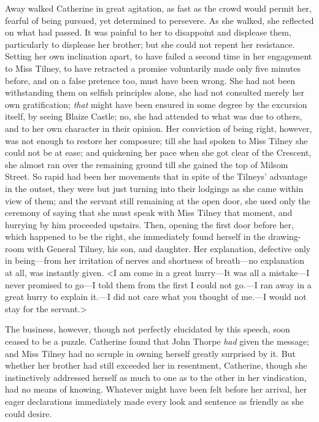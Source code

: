  Away walked Catherine in great agitation, as fast as the crowd would permit her, fearful of being pursued, yet determined to persevere. As she walked, she reflected on what had passed. It was painful to her to disappoint and displease them, particularly to displease her brother; but she could not repent her resistance. Setting her own inclination apart, to have failed a second time in her engagement to Miss Tilney, to have retracted a promise voluntarily made only five minutes before, and on a false pretence too, must have been wrong. She had not been withstanding them on selfish principles alone, she had not consulted merely her own gratification; \textit{that} might have been ensured in some degree by the excursion itself, by seeing Blaize Castle; no, she had attended to what was due to others, and to her own character in their opinion. Her conviction of being right, however, was not enough to restore her composure; till she had spoken to Miss Tilney she could not be at ease; and quickening her pace when she got clear of the Crescent, she almost ran over the remaining ground till she gained the top of Milsom Street. So rapid had been her movements that in spite of the Tilneys' advantage in the outset, they were but just turning into their lodgings as she came within view of them; and the servant still remaining at the open door, she used only the ceremony of saying that she must speak with Miss Tilney that moment, and hurrying by him proceeded upstairs. Then, opening the first door before her, which happened to be the right, she immediately found herself in the drawing-room with General Tilney, his son, and daughter. Her explanation, defective only in being—from her irritation of nerves and shortness of breath—no explanation at all, was instantly given. <I am come in a great hurry—It was all a mistake—I never promised to go—I told them from the first I could not go.—I ran away in a great hurry to explain it.—I did not care what you thought of me.—I would not stay for the servant.> 

 The business, however, though not perfectly elucidated by this speech, soon ceased to be a puzzle. Catherine found that John Thorpe \textit{had} given the message; and Miss Tilney had no scruple in owning herself greatly surprised by it. But whether her brother had still exceeded her in resentment, Catherine, though she instinctively addressed herself as much to one as to the other in her vindication, had no means of knowing. Whatever might have been felt before her arrival, her eager declarations immediately made every look and sentence as friendly as she could desire. 


